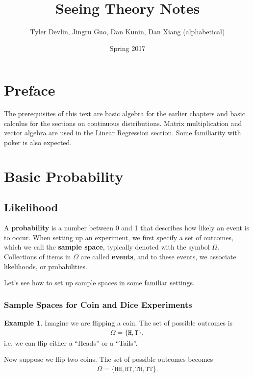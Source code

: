 \documentclass[11pt,letterpaper]{article}
\newcommand\hd{\texttt{H}}
\newcommand\tl{\texttt{T}}
\numberwithin{theorem}{section}
\numberwithin{definition}{section}
\numberwithin{lemma}{section}
\numberwithin{corollary}{section}
\numberwithin{proposition}{section}
\theoremstyle{definition}
\numberwithin{remark}{section}
\numberwithin{claim}{section}
\numberwithin{observation}{section}
\numberwithin{fact}{section}
\numberwithin{assumption}{section}
\newtheorem{example}[theorem]{Example}
\numberwithin{example}{section}
\numberwithin{exercise}{section}
\begin{document}
\title{Seeing Theory Notes}
\author{Tyler Devlin, Jingru Guo, Dan Kunin, Dan Xiang (alphabetical)}
\date{Spring 2017}%
\maketitle

\newpage

\tableofcontents

\newpage

\section{Preface}
The prerequisites of this text are basic algebra for the earlier chapters and basic calculus for the sections on continuous distributions. Matrix multiplication and vector algebra are used in the Linear Regression section. Some familiarity with poker is also expected. 

\section{Basic Probability}

\subsection{Likelihood}


A \textbf{probability} is a number between 0 and 1 that describes how likely an event is to occur. When setting up an experiment, we first specify a set of outcomes, which we call the \textbf{sample space}, typically denoted with the symbol $\Omega$. Collections of items in $\Omega$ are called \textbf{events}, and to these events, we associate likelihoods, or probabilities.

Let's see how to set up sample spaces in some familiar settings.

\subsubsection{Sample Spaces for Coin and Dice Experiments}

\begin{example}
Imagine we are flipping a coin. The set of possible outcomes is
\begin{align*}
\Omega = \{\hd,\tl\},
\end{align*}
i.e. we can flip either a ``Heads'' or a ``Tails''. 

Now suppose we flip two coins. The set of possible outcomes becomes
\begin{align*}
\Omega = \{\hd \hd, \hd \tl, \tl \hd, \tl \tl\}.
\end{align*}
\end{example}
\end{document}
